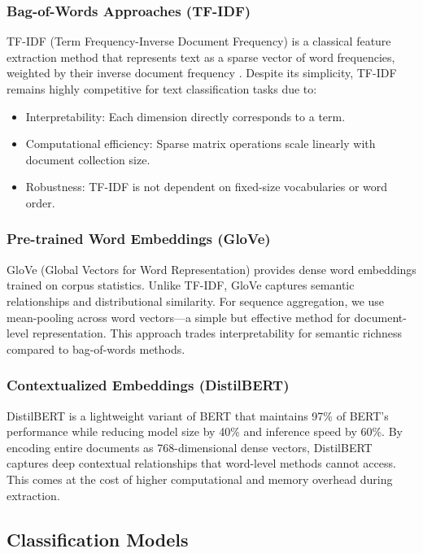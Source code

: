 \documentclass[12pt, a4paper]{article}
\begin{document}
\subsubsection{Bag-of-Words Approaches (TF-IDF)}
TF-IDF (Term Frequency-Inverse Document Frequency) is a classical feature extraction method that represents text as a sparse vector of word frequencies, weighted by their inverse document frequency \cite{sparck1972statistical}. Despite its simplicity, TF-IDF remains highly competitive for text classification tasks due to:
\begin{itemize}
    \item Interpretability: Each dimension directly corresponds to a term.
    \item Computational efficiency: Sparse matrix operations scale linearly with document collection size.
    \item Robustness: TF-IDF is not dependent on fixed-size vocabularies or word order.
\end{itemize}

\subsubsection{Pre-trained Word Embeddings (GloVe)}
GloVe (Global Vectors for Word Representation) \cite{pennington2014glove} provides dense word embeddings trained on corpus statistics. Unlike TF-IDF, GloVe captures semantic relationships and distributional similarity. For sequence aggregation, we use mean-pooling across word vectors---a simple but effective method for document-level representation. This approach trades interpretability for semantic richness compared to bag-of-words methods.

\subsubsection{Contextualized Embeddings (DistilBERT)}
DistilBERT \cite{sanh2019distilbert} is a lightweight variant of BERT that maintains 97\% of BERT's performance while reducing model size by 40\% and inference speed by 60\%. By encoding entire documents as 768-dimensional dense vectors, DistilBERT captures deep contextual relationships that word-level methods cannot access. This comes at the cost of higher computational and memory overhead during extraction.

\subsection{Classification Models}
\end{document}

